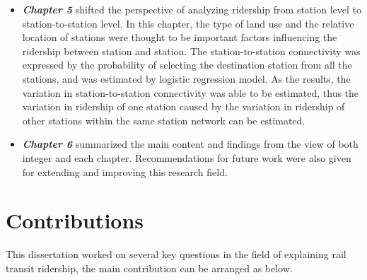 \begin{itemize}
	\item \emph{\textbf{Chapter 5}} shifted the perspective of analyzing ridership from station level to station-to-station level. In this chapter, the type of land use and the relative location of stations were thought to be important factors influencing the ridership between station and station. The station-to-station connectivity was expressed by the probability of selecting the destination station from all the stations, and was estimated by logistic regression model. As the results, the variation in station-to-station connectivity was able to be estimated, thus the variation in ridership of one station caused by the variation in ridership of other stations within the same station network can be estimated.
	
	\item \emph{\textbf{Chapter 6}} summarized the main content and findings from the view of both integer and each chapter. Recommendations for future work were also given for extending and improving this research field.
\end{itemize}

\section{Contributions}

This dissertation worked on several key questions in the field of explaining rail transit ridership, the main contribution can be arranged as below.

